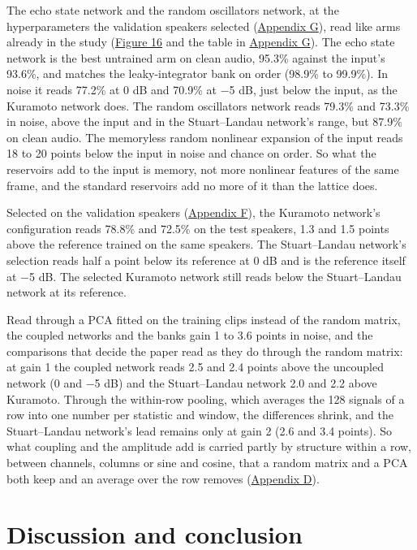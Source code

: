 \documentclass{article}
\makeatletter
\newcommand{\iclr@floatbarrier}{\par\vspace{\z@}%
  \ifx\@deferlist\@empty\else\clearpage\fi}
\let\iclr@section\section
\renewcommand{\section}{\iclr@floatbarrier\iclr@section}
\makeatother
\begin{document}
The echo state network and the random oscillators network, at the
hyperparameters the validation speakers selected
(\hyperref[sec-G]{Appendix G}), read like arms already in the study
(\hyperref[fig-fig13-sec4-8-reservoir-baselines]{Figure 16} and the
table in \hyperref[sec-G]{Appendix G}). The echo state network is the
best untrained arm on clean audio, 95.3\% against the input's 93.6\%,
and matches the leaky-integrator bank on order (98.9\% to 99.9\%). In
noise it reads 77.2\% at 0 dB and 70.9\% at \ensuremath{-}5 dB, just
below the input, as the Kuramoto network does. The random oscillators
network reads 79.3\% and 73.3\% in noise, above the input and in the
Stuart--Landau network's range, but 87.9\% on clean audio. The
memoryless random nonlinear expansion of the input reads 18 to 20 points
below the input in noise and chance on order. So what the reservoirs add
to the input is memory, not more nonlinear features of the same frame,
and the standard reservoirs add no more of it than the lattice does.

Selected on the validation speakers (\hyperref[sec-F]{Appendix F}), the
Kuramoto network's configuration reads 78.8\% and 72.5\% on the test
speakers, 1.3 and 1.5 points above the reference trained on the same
speakers. The Stuart--Landau network's selection reads half a point
below its reference at 0 dB and is the reference itself at
\ensuremath{-}5 dB. The selected Kuramoto network still reads below the
Stuart--Landau network at its reference.

Read through a PCA fitted on the training clips instead of the random
matrix, the coupled networks and the banks gain 1 to 3.6 points in
noise, and the comparisons that decide the paper read as they do through
the random matrix: at gain 1 the coupled network reads 2.5 and 2.4
points above the uncoupled network (0 and \ensuremath{-}5 dB) and the
Stuart--Landau network 2.0 and 2.2 above Kuramoto. Through the
within-row pooling, which averages the 128 signals of a row into one
number per statistic and window, the differences shrink, and the
Stuart--Landau network's lead remains only at gain 2 (2.6 and 3.4
points). So what coupling and the amplitude add is carried partly by
structure within a row, between channels, columns or sine and cosine,
that a random matrix and a PCA both keep and an average over the row
removes (\hyperref[sec-D]{Appendix D}).

\section{Discussion and conclusion}\label{sec-5}
\end{document}
